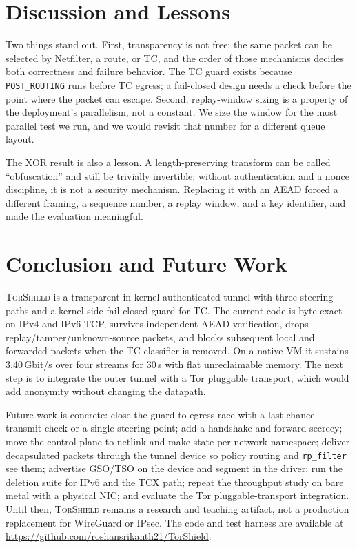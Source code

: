 \documentclass[conference]{IEEEtran}
\newcommand{\sys}{\textsc{TorShield}}
\newcommand{\code}[1]{\texttt{#1}}
\begin{document}
\section{Discussion and Lessons}
Two things stand out. First, transparency is not free: the same packet can be selected by Netfilter, a route, or TC, and the order of those mechanisms decides both correctness and failure behavior. The TC guard exists because \code{POST\_ROUTING} runs before TC egress; a fail-closed design needs a check before the point where the packet can escape. Second, replay-window sizing is a property of the deployment's parallelism, not a constant. We size the window for the most parallel test we run, and we would revisit that number for a different queue layout.

The XOR result is also a lesson. A length-preserving transform can be called ``obfuscation'' and still be trivially invertible; without authentication and a nonce discipline, it is not a security mechanism. Replacing it with an AEAD forced a different framing, a sequence number, a replay window, and a key identifier, and made the evaluation meaningful.

\section{Conclusion and Future Work}
\sys{} is a transparent in-kernel authenticated tunnel with three steering paths and a kernel-side fail-closed guard for TC. The current code is byte-exact on IPv4 and IPv6 TCP, survives independent AEAD verification, drops replay/tamper/unknown-source packets, and blocks subsequent local and forwarded packets when the TC classifier is removed. On a native VM it sustains 3.40\,Gbit/s over four streams for 30\,s with flat unreclaimable memory. The next step is to integrate the outer tunnel with a Tor pluggable transport, which would add anonymity without changing the datapath.

Future work is concrete: close the guard-to-egress race with a last-chance transmit check or a single steering point; add a handshake and forward secrecy; move the control plane to netlink and make state per-network-namespace; deliver decapsulated packets through the tunnel device so policy routing and \code{rp\_filter} see them; advertise GSO/TSO on the device and segment in the driver; run the deletion suite for IPv6 and the TCX path; repeat the throughput study on bare metal with a physical NIC; and evaluate the Tor pluggable-transport integration. Until then, \sys{} remains a research and teaching artifact, not a production replacement for WireGuard or IPsec. The code and test harness are available at \url{https://github.com/roshansrikanth21/TorShield}.



\end{document}

